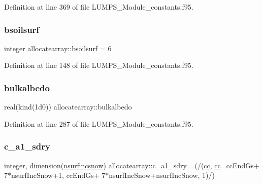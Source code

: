 Definition at line 369 of file L\+U\+M\+P\+S\+\_\+\+Module\+\_\+constants.\+f95.

\mbox{\label{namespaceallocatearray_a570d73b34ec4b42f6f6075640a282619}} 
\subsubsection{\texorpdfstring{bsoilsurf}{bsoilsurf}}
{\footnotesize\ttfamily integer allocatearray\+::bsoilsurf = 6}



Definition at line 148 of file L\+U\+M\+P\+S\+\_\+\+Module\+\_\+constants.\+f95.

\mbox{\label{namespaceallocatearray_a7ded7a35772c822d536989835435a474}} 
\subsubsection{\texorpdfstring{bulkalbedo}{bulkalbedo}}
{\footnotesize\ttfamily real(kind(1d0)) allocatearray\+::bulkalbedo}



Definition at line 287 of file L\+U\+M\+P\+S\+\_\+\+Module\+\_\+constants.\+f95.

\mbox{\label{namespaceallocatearray_aeb286eaa02498b48dc4c2ecaf21d7af5}} 
\subsubsection{\texorpdfstring{c\+\_\+a1\+\_\+sdry}{c\_a1\_sdry}}
{\footnotesize\ttfamily integer, dimension(\hyperlink{namespaceallocatearray_af4d113f332b6759cfa22271140c9162d}{nsurfincsnow}) allocatearray\+::c\+\_\+a1\+\_\+sdry =(/(\hyperlink{namespaceallocatearray_ac863c81704eb507dee10f5e10741e10c}{cc}, \hyperlink{namespaceallocatearray_ac863c81704eb507dee10f5e10741e10c}{cc}=cc\+End\+Gs+ 7$\ast$nsurf\+Inc\+Snow+1, cc\+End\+Gs+ 7$\ast$nsurf\+Inc\+Snow+nsurf\+Inc\+Snow, 1)/)}



